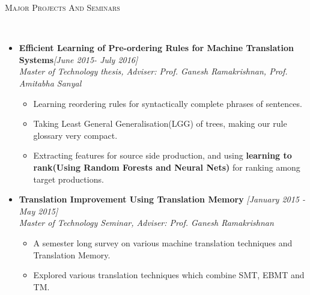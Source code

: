 \documentclass[a4paper,10pt]{article}
\newenvironment{changemargin}[2]{%
	\begin{list}{}{%
			\setlength{\topsep}{0pt}%
			\setlength{\leftmargin}{#1}%
			\setlength{\rightmargin}{#2}%
			\setlength{\listparindent}{\parindent}%
			\setlength{\parsep}{\parskip}%
		}%
		\item[]}{\end{list}
}
\newcommand{\lineover}{
	\begin{changemargin}{-0.0in}{-0.0in}
		\vspace*{-8pt}
		\hrulefill \\
		\vspace*{-2pt}
	\end{changemargin}
}
\newcommand{\header}[1]{
	\begin{changemargin}{-0.0in}{-0.0in}
		\large	\scshape {#1}\\	
		\lineover
	\end{changemargin}
}
\newenvironment{body} {
	\vspace*{-16pt}
	\begin{changemargin}{-0.0in}{-0.in}
	}	
	{\end{changemargin}
}
\begin{document}
	
	\vspace{-1ex}
	\header{Major Projects And Seminars}
    \vspace{-0.5ex}
	\begin{body}
		\vspace{14pt}
		\begin{itemize}
			\setlength{\itemindent}{0em}
			\item \textbf{Efficient Learning of Pre-ordering Rules for Machine Translation Systems}\hfill  \emph{[June 2015- July 2016]}\\
			\emph{Master of Technology thesis, Adviser: Prof. Ganesh Ramakrishnan, Prof. Amitabha Sanyal} \vspace{-1ex}
			\begin{itemize}
				\setlength{\itemindent}{0em}
				\item Learning reordering rules for syntactically complete phrases of sentences.
				\vspace{-0.5ex}
				\item Taking Least General Generalisation(LGG) of trees, making our rule glossary very compact.
				\vspace{-0.5ex}
				\item Extracting features for source side production, and using \textbf{learning to rank(Using Random Forests and Neural Nets)}  for ranking among target productions.
				
			\end{itemize}
			\vspace{-1ex}
			
			\item \textbf{Translation Improvement Using Translation Memory }\hfill  \emph{[January 2015 - May 2015]}\\
			\emph{Master of Technology Seminar, Adviser: Prof. Ganesh Ramakrishnan}
			\vspace{-1ex}
			\begin{itemize}
				\setlength{\itemindent}{0em}
				\item A semester long survey on various machine translation techniques and Translation Memory.
				\vspace{-0.5ex}
				\item Explored various translation techniques which combine SMT, EBMT and TM.
			\end{itemize}
		\end{itemize}
		
	\end{body}
	
\end{document}
